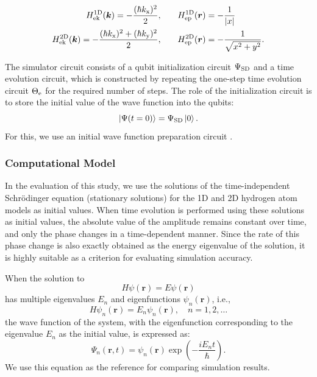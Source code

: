 \documentclass[report_2025.tex]{subfiles}
\begin{document}
\begin{align}
   H_{\mathrm{ek}}^{\mathrm{1D}}(\bm{k}) = -\frac{(\hbar k_{\mathrm{x}})^2}{2}, \qquad &
   H_{\mathrm{ep}}^{\mathrm{1D}}(\bm{r}) = -\frac{1}{{\left| x \right|}} \label{eq:HkHp1D}\\
   H_{\mathrm{ek}}^{\mathrm{2D}}(\bm{k}) = -\frac{(\hbar k_{\mathrm{x}})^2 + (\hbar k_{\mathrm{y}})^2}{2}, \qquad &
   H_{\mathrm{ep}}^{\mathrm{2D}}(\bm{r}) = -\frac{1}{\sqrt{x^2+y^2}}. \label{eq:HkHp2D}
\end{align}

The simulator circuit consists of a qubit initialization circuit $\Psi_{\mathrm{SD}}$ and a
time evolution circuit, which is constructed by repeating the one-step time
evolution circuit $\Theta_{\mathrm{e}}$ for the required number of steps. The role of the
initialization circuit is to store the initial value of the wave function into
the qubits:
\begin{equation}
\ket{\Psi(t=0)} = \Psi_{\mathrm{SD}} \ket{0}.
\end{equation}
For this, we use an initial wave function preparation circuit \cite[Sec.
2.2]{takahashi2024.doi:10.1021/acs.jctc.4c00708}.

\subsubsection{Computational Model}
In the evaluation of this study, we use the solutions of the time-independent
Schrödinger equation (stationary solutions) for the 1D and 2D hydrogen atom
models as initial values. When time evolution is performed using these solutions
as initial values, the absolute value of the amplitude remains constant over
time, and only the phase changes in a time-dependent manner. Since the rate of
this phase change is also exactly obtained as the energy eigenvalue of the
solution, it is highly suitable as a criterion for evaluating simulation
accuracy.

When the solution to 
\begin{equation}
H\psi(\bm{r})=E\psi(\bm{r})
\end{equation}
has multiple eigenvalues $E_n$ and eigenfunctions $\psi_n(\bm{r})$, i.e.,
\begin{equation}
H\psi_n(\bm{r})=E_n\psi_n(\bm{r}),\quad n=1,2,\ldots
\end{equation}
the wave function of the system, with the eigenfunction corresponding to the
eigenvalue $E_n$ as the initial value, is expressed as:
\begin{equation}
\Psi_n(\bm{r},t)=\psi_n(\bm{r})\exp\left(-\frac{iE_nt}{\hbar}\right).
\end{equation}
We use this equation as the reference for comparing simulation results.
\end{document}
